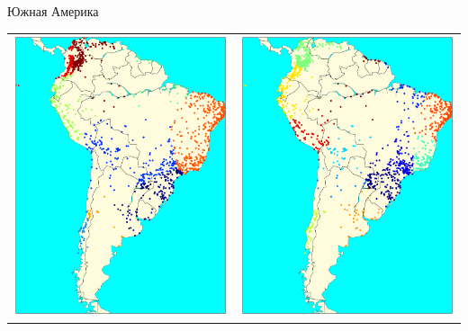 \documentclass[12pt, a4paper]{article}
\begin{document}
\begin{center}
			Южная Америка

			\begin{tabular}{c c}
				\includegraphics[width=8cm]{SA_k_means.pdf} &
				\includegraphics[width=8cm]{SA_k_medoids.pdf} \\
			\end{tabular}
			\end{center}
\end{document}

